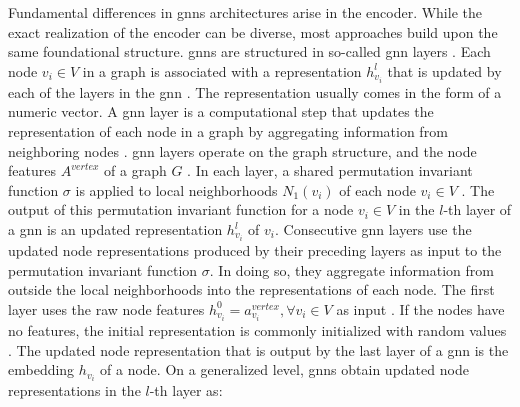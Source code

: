 Fundamental differences in \glspl{gnn} architectures arise in the encoder. While the exact realization of the encoder can be diverse, most approaches build upon the same foundational structure. \glspl{gnn} are structured in so-called \gls{gnn} layers \cite{bronstein_geometric_2021, wu_comprehensive_2021, zhou_graph_2020}. Each node $v_i \in V$ in a graph is associated with a representation $h_{v_i}^l$ that is updated by each of the layers in the \gls{gnn} \cite{bronstein_geometric_2021}. The representation usually comes in the form of a numeric vector. A \gls{gnn} layer is a computational step that updates the representation of each node in a graph by aggregating information from neighboring nodes \cite{wu_comprehensive_2021}. 
\gls{gnn} layers operate on the graph structure, and the node features $A^{vertex}$ of a graph $G$ \cite{bronstein_geometric_2021}. In each layer, a shared permutation invariant function $\sigma$ is applied to local neighborhoods $N_1(v_i)$ of each node $v_i \in V$ \cite{bronstein_geometric_2021}. The output of this permutation invariant function for a node $v_i \in V$ in the $l$-th layer of a \gls{gnn} is an updated representation $h_{v_i}^l$ of $v_i$. Consecutive \gls{gnn} layers use the updated node representations produced by their preceding layers as input to the permutation invariant function $\sigma$. In doing so, they aggregate information from outside the local neighborhoods into the representations of each node. The first layer uses the raw node features $h_{v_i}^0 = a^{vertex}_{v_i}, \forall v_i \in V$ as input \cite{hamilton_representation_2017}. If the nodes have no features, the initial representation is commonly initialized with random values \cite{wu_comprehensive_2021}. The updated node representation that is output by the last layer of a \gls{gnn} is the embedding $h_{v_i}$ of a node. On a generalized level, \glspl{gnn} obtain updated node representations in the $l$-th layer as:


